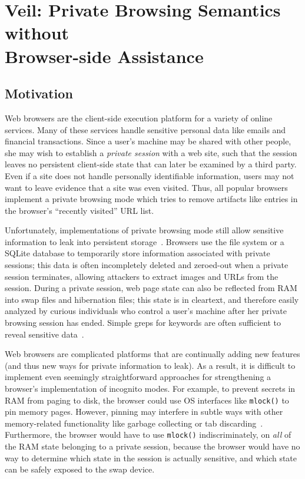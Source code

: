 \section[Veil: Private Browsing Semantics without Browser-side Assistance]{Veil: Private Browsing Semantics without \\ Browser-side Assistance}
\label{chap:veil}


\subsection{Motivation}
Web browsers are the client-side execution platform
for a variety of online services. Many of these
services handle sensitive personal data like emails
and financial transactions. Since a user's machine
may be shared with other people, she may wish to
establish a \emph{private session} with a web site,
such that the session leaves no persistent
client-side state that can later be examined by a
third party. Even if a site does not handle
personally identifiable information, users may
not want to leave evidence that a site was even
visited. Thus, all popular browsers implement a
private browsing mode which tries to remove
artifacts like entries in the browser's ``recently
visited'' URL list.

Unfortunately, implementations of private browsing
mode still allow sensitive information to leak into
persistent storage~\cite{aggarwal10,dt2016,magnetForensicsChrome,ohana13}.
Browsers use the file system or a SQLite database
to temporarily store information associated with private
sessions; this data is often incompletely deleted
and zeroed-out when a private session terminates,
allowing attackers to extract images and URLs from
the session. During a private session, web page
state can also be reflected from RAM into swap
files and hibernation files; this state is in cleartext,
and therefore easily analyzed by curious individuals
who control a user's machine after her private
browsing session has ended. Simple greps for
keywords are often sufficient to reveal sensitive
data~\cite{aggarwal10,dt2016}.

Web browsers are complicated platforms that are
continually adding new features (and thus new ways
for private information to leak). As a result, it is
difficult to implement even seemingly straightforward
approaches for strengthening a browser's implementation
of incognito modes. For example, to prevent secrets in
RAM from paging to disk, the browser could use OS
interfaces like \texttt{mlock()} to pin memory pages.
However, pinning may interfere in subtle ways with other
memory-related functionality like garbage collecting or
tab discarding~\cite{tabDiscarding}.
Furthermore, the browser would have to use \texttt{mlock()}
indiscriminately, on \textit{all} of the RAM state
belonging to a private session, because the browser would
have no way to determine which state in the session is
actually sensitive, and which state can be safely
exposed to the swap device.

